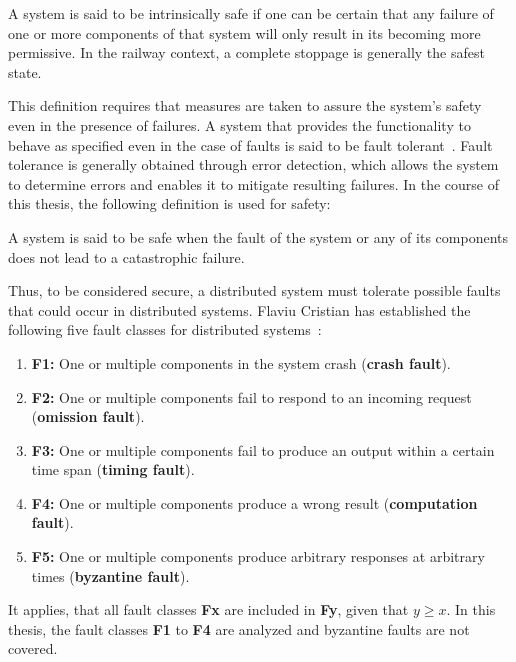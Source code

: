 \begin{definition}
A system is said to be intrinsically safe if one can be certain that any failure of one or more components of that system will only result in its becoming more permissive.
In the railway context, a complete stoppage is generally the safest state.
\label{def:intrinsic_safety}
\end{definition}

This definition requires that measures are taken to assure the system's safety even in the presence of failures.
A system that provides the functionality to behave as specified even in the case of faults is said to be fault tolerant~\cite{AvizienisDependability2001}.
Fault tolerance is generally obtained through error detection, which allows the system to determine errors and enables it to mitigate resulting failures.
In the course of this thesis, the following definition is used for safety:

\begin{definition}
A system is said to be safe when the fault of the system or any of its components does not lead to a catastrophic failure.
\label{def:safety}
\end{definition}

Thus, to be considered secure, a distributed system must tolerate possible faults that could occur in distributed systems.
Flaviu Cristian has established the following five fault classes for distributed systems~\cite{CristianFaultModel}:

\begin{enumerate}
\item \textbf{F1:} One or multiple components in the system crash (\textbf{crash fault}).
\item \textbf{F2:} One or multiple components fail to respond to an incoming request (\textbf{omission fault}).
\item \textbf{F3:} One or multiple components fail to produce an output within a certain time span (\textbf{timing fault}).
\item \textbf{F4:} One or multiple components produce a wrong result (\textbf{computation fault}).
\item \textbf{F5:} One or multiple components produce arbitrary responses at arbitrary times (\textbf{byzantine fault}).
\end{enumerate}

It applies, that all fault classes \textbf{Fx} are included in \textbf{Fy}, given that $y \geq x$.
In this thesis, the fault classes \textbf{F1} to \textbf{F4} are analyzed and byzantine faults are not covered.
\\

